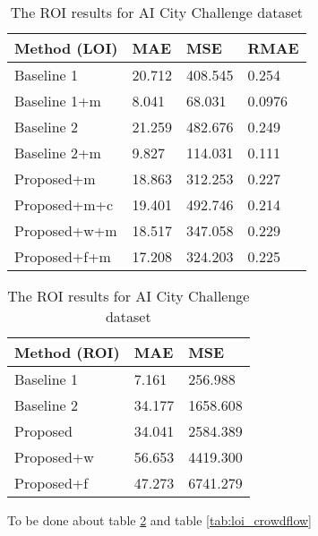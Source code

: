 \begin{table}[!htb]
	\begin{minipage}{.5\linewidth}
      \centering
		\begin{tabular}{llll}
		\hline
		Method (LOI)                               & MAE & MSE & RMAE \\ \hline
		\multicolumn{1}{l|}{Baseline 1}          & 20.712 & 408.545 & 0.254 \\
		\multicolumn{1}{l|}{Baseline 1+m}          & 8.041 & 68.031 & 0.0976 \\
		\multicolumn{1}{l|}{Baseline 2}          & 21.259 & 482.676 & 0.249 \\
		\multicolumn{1}{l|}{Baseline 2+m}      & 9.827 & 114.031 & 0.111 \\
		\multicolumn{1}{l|}{Proposed+m}        	 & 18.863 & 312.253 & 0.227 \\
		\multicolumn{1}{l|}{Proposed+m+c}        & 19.401 & 492.746 & 0.214 \\
		\multicolumn{1}{l|}{Proposed+w+m}        & 18.517 & 347.058 & 0.229 \\
		\multicolumn{1}{l|}{Proposed+f+m}        & 17.208 & 324.203 & 0.225 \\ \hline
		\end{tabular}
		\caption{\label{tab:loi_crowdflow}The LOI results for AI City Challenge dataset}
	\end{minipage}
	\begin{minipage}{.5\linewidth}
      \centering
		\begin{tabular}{lll}
		\hline
		Method (ROI)                               & MAE & MSE \\ \hline
		\multicolumn{1}{l|}{Baseline 1}          & 7.161 & 256.988 \\
		\multicolumn{1}{l|}{Baseline 2}          & 34.177 & 1658.608 \\
		\multicolumn{1}{l|}{Proposed}        	 & 34.041 & 2584.389 \\
		\multicolumn{1}{l|}{Proposed+w} 		 & 56.653 & 4419.300 \\
		\multicolumn{1}{l|}{Proposed+f} & 47.273 & 6741.279 \\ \hline
		\end{tabular}
		\caption{\label{tab:roi_crowdflow}The ROI results for AI City Challenge dataset}
	\end{minipage}
\end{table}

To be done about table \ref{tab:roi_crowdflow} and table \ref{tab:loi_crowdflow}



